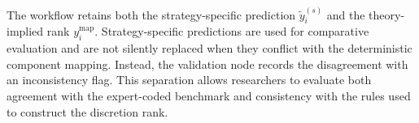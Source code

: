 
The workflow retains both the strategy-specific prediction
\(\tilde y_i^{(s)}\) and the theory-implied rank
\(y_i^{\mathrm{map}}\). Strategy-specific predictions are used for
comparative evaluation and are not silently replaced when they conflict
with the deterministic component mapping. Instead, the validation node
records the disagreement with an inconsistency flag. This separation allows 
researchers to evaluate both agreement with the expert-coded benchmark and 
consistency with the rules used to construct the discretion rank.


%
%
%


%
%

